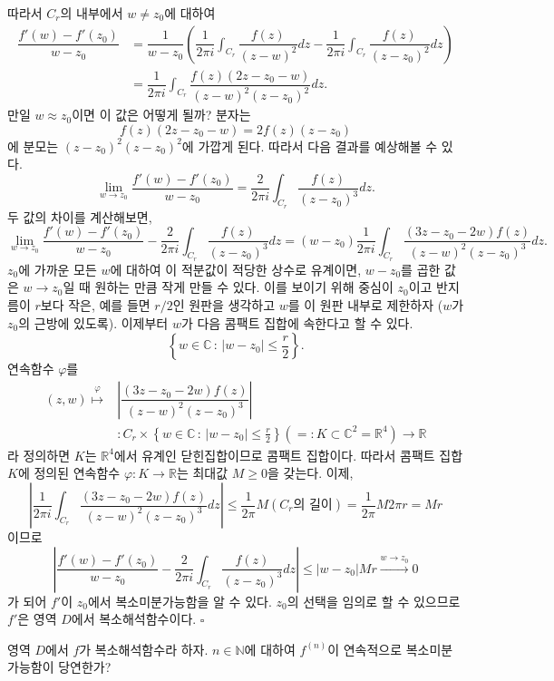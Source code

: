 따라서 $C_r$의 내부에서 $w\ne z_0$에 대하여 
\begin{align*}
\dfrac{f'(w)-f'(z_0)}{w-z_0}
&= \dfrac1{w-z_0} \left(
\dfrac1{2\pi i} \int_{C_r} \dfrac{f(z)}{(z-w)^2}dz 
- \dfrac1{2\pi i} \int_{C_r} \dfrac{f(z)}{(z-z_0)^2}dz 
\right) \\
&= \dfrac1{2\pi i}\int_{C_r} \dfrac{f(z)(2z - z_0 -w)}{(z-w)^2(z-z_0)^2} dz.
\end{align*}
만일 $w\approx z_0$이면 이 값은 어떻게 될까?
분자는 
\[
f(z)(2z - z_0 -w) = 2f(z)(z-z_0)
\]
에 분모는 $(z-z_0)^2(z-z_0)^2$에 가깝게 된다.
따라서 다음 결과를 예상해볼 수 있다.
\[
\lim_{w\to z_0} \dfrac{f'(w) - f'(z_0)}{w-z_0} = \dfrac2{2\pi i} \int_{C_r} \dfrac{f(z)}{(z-z_0)^3}dz.
\]
두 값의 차이를 계산해보면,
\[
\lim_{w\to z_0} \dfrac{f'(w) - f'(z_0)}{w-z_0} - \dfrac2{2\pi i} \int_{C_r} \dfrac{f(z)}{(z-z_0)^3}dz
= (w-z_0) \dfrac1{2\pi i} \int_{C_r} \dfrac{(3z-z_0-2w)f(z)}{(z-w)^2(z-z_0)^3}dz.
\]
$z_0$에 가까운 모든 $w$에 대하여 이 적분값이 적당한 상수로 유계이면,
$w-z_0$를 곱한 값은 $w\to z_0$일 때 원하는 만큼 작게 만들 수 있다.
이를 보이기 위해 중심이 $z_0$이고 반지름이 $r$보다 작은, 예를 들면 $r/2$인
원판을  생각하고 $w$를 이 원판 내부로 제한하자 ($w$가 $z_0$의 근방에 있도록).
이제부터 $w$가 다음 콤팩트 집합에 속한다고 할 수 있다.
\[
\left\{ w\in\mathbb C\,:\, |w-z_0| \le \frac r2 \right\}.
\]
연속함수 $\varphi$를
\begin{align*}
(z,w) \stackrel{\varphi}{\mapsto} & \left| \dfrac{(3z-z_0-2w)f(z)}{(z-w)^2(z-z_0)^3} \right| \\
& : C_r \times \left\{w\in\mathbb C\,:\, |w-z_0| \le \frac r2 \right\}
(=: K \subset \mathbb C^2 = \mathbb R^4 ) \to \mathbb R
\end{align*}
라 정의하면 $K$는 $\mathbb R^4$에서 유계인 닫힌집합이므로 콤팩트 집합이다.
따라서 콤팩트 집합 $K$에 정의된 연속함수 $\varphi : K \to \mathbb R$는 
최대값 $M\ge0$을 갖는다.
이제,
\[
\left| \dfrac1{2\pi i}\int_{C_r} \dfrac{(3z - z_0 -2w)f(z)}{(z-w)^2(z-z_0)^3} dz \right|
\le \dfrac1{2\pi} M(C_r\text{의 길이}) = \dfrac1{2\pi}M2\pi r = Mr
\]
이므로
\[
\left| \dfrac{f'(w) - f'(z_0)}{w-z_0} - \dfrac2{2\pi i} \int_{C_r} \dfrac{f(z)}{(z-z_0)^3}dz \right|
\le |w-z_0|Mr \stackrel{w\to z_0}{\longrightarrow} 0
\]
가 되어 $f'$이 $z_0$에서 복소미분가능함을 알 수 있다.
$z_0$의 선택을 임의로 할 수 있으므로 $f'$은 영역 $D$에서 복소해석함수이다.
\hfill $\square$

\begin{salt_exercise} \label{ex-3-29}
영역  $D$에서 $f$가 복소해석함수라 하자.
$n\in\mathbb N$에 대하여 $f^{(n)}$이 연속적으로 복소미분가능함이 당연한가?
\end{salt_exercise}

